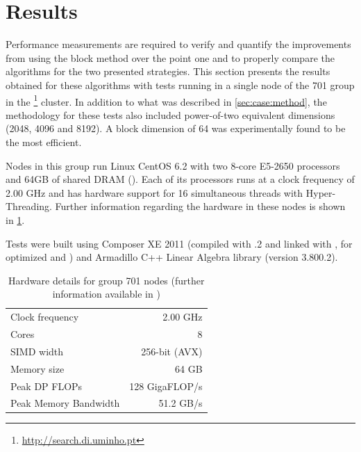 \documentclass[../thesis]{subfiles}
\begin{document}
	\section{Results}
	\label{sec:multicore:results}

	Performance measurements are required to verify and quantify the improvements from using the block method over the point one and to properly compare the algorithms for the two presented strategies. This section presents the results obtained for these algorithms with tests running in a single node of the 701 group in the \search\footnote{\url{http://search.di.uminho.pt}} cluster. In addition to what was described in \cref{sec:case:method}, the methodology for these tests also included power-of-two equivalent dimensions (2048, 4096 and 8192). A block dimension of 64 was experimentally found to be the most efficient.

	Nodes in this group run Linux CentOS 6.2 with two 8-core \intel\xeon E5-2650 processors and 64GB of shared DRAM (\numa). Each of its processors runs at a clock frequency of 2.00 GHz and has hardware support for 16 simultaneous threads with \intel Hyper-Threading. Further information regarding the hardware in these nodes is shown in \cref{tab:search:701}.

	Tests were built using \intel Composer XE 2011 (compiled with .2 and linked with \intel\mkl, for optimized \blas and \lapack) and Armadillo C++ Linear Algebra library (version 3.800.2).

	\begin{table}[!htp]
		\begin{center}
			\begin{tabular}{lr}
				\hline
				Clock frequency & 2.00 GHz \\
				Cores & 8 \\
				SIMD width & 256-bit (\acs{AVX}) \\
				Memory size & 64 GB \\
				\hline
				Peak DP FLOPs & 128 GigaFLOP/s \\
				Peak Memory Bandwidth & 51.2 GB/s \\ 
				\hline
			\end{tabular}
		\end{center}
		\caption[Hardware details for \search group 701 nodes]{Hardware details for \search group 701 nodes (further information available in \cite{Intel:Xeon:e5_2650,Intel:Xeon:e5_2600})}
		\label{tab:search:701}
	\end{table}
\end{document}
